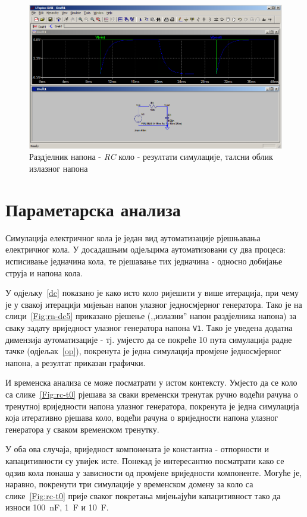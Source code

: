 \begin{figure}[h]
\centering
\includegraphics[width=\figwidth\textwidth]{figs/rc-t8.PNG}
\caption{Раздјелник напона - \textit{RC} коло - резултати симулације, талсни облик излазног напона}
\label{Fig:rc-t8}
\end{figure}

\section{Параметарска анализа}
\label{param}

Симулација електричног кола је један вид аутоматизације рјешњавања електричног кола. У досадашњим одјељцима аутоматизовани су два процеса: исписивање једначина кола, те рјешавање тих једначина - односно добијање струја и напона кола.

У одјељку~\ref{dc} показано је како исто коло ријешити у више итерација, при чему је у свакој итерацији мијењан напон улазног једносмјерног генератора. Тако је на слици~\ref{Fig:rn-dc5} приказано рјешење (,,излазни'' напон раздјелника напона) за сваку задату вриједност улазног генератора напона \texttt{V1}. Тако је уведена додатна димензија аутоматизације - тј. умјесто да се покреће 10 пута симулација радне тачке (одјељак~\ref{op}), покренута је једна симулација промјене једносмјерног напона, а резултат приказан графички. 

И временска анализа се може посматрати у истом контексту. Умјесто да се коло са слике~\ref{Fig:rc-t0} рјешава за сваки временски тренутак ручно водећи рачуна о тренутној вриједности напона улазног генератора, покренута је једна симулација која итеративно рјешава коло, водећи рачуна о вриједности напона улазног генератора у сваком временском тренутку.

У оба ова случаја, вриједност компонената је константна - отпорности и капацитивности су увијек исте. Понекад је интересантно посматрати како се одзив кола понаша у зависности од промјене вриједности компоненте. Могуће је, наравно, покренути три симулације у временском домену за коло са слике~\ref{Fig:rc-t0} прије сваког покретања мијењајући капацитивност тако да износи 100~nF, 1~\textmugreek F и 10~\textmugreek F. 

